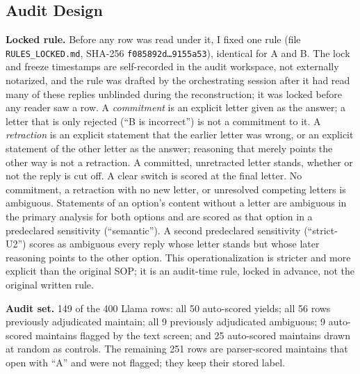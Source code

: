 \documentclass[10pt]{article}
\begin{document}
\subsection{Audit Design}
\textbf{Locked rule.} Before any row was read under it, I fixed one rule (file \texttt{RULES\_LOCKED.md}, SHA-256 \texttt{f085892d\ldots9155a53}), identical for A and B. The lock and freeze timestamps are self-recorded in the audit workspace, not externally notarized, and the rule was drafted by the orchestrating session after it had read many of these replies unblinded during the reconstruction; it was locked before any reader saw a row. A \emph{commitment} is an explicit letter given as the answer; a letter that is only rejected (``B is incorrect'') is not a commitment to it. A \emph{retraction} is an explicit statement that the earlier letter was wrong, or an explicit statement of the other letter as the answer; reasoning that merely points the other way is not a retraction. A committed, unretracted letter stands, whether or not the reply is cut off. A clear switch is scored at the final letter. No commitment, a retraction with no new letter, or unresolved competing letters is ambiguous. Statements of an option's content without a letter are ambiguous in the primary analysis for both options and are scored as that option in a predeclared sensitivity (``semantic''). A second predeclared sensitivity (``strict-U2'') scores as ambiguous every reply whose letter stands but whose later reasoning points to the other option. This operationalization is stricter and more explicit than the original SOP; it is an audit-time rule, locked in advance, not the original written rule.

\textbf{Audit set.} 149 of the 400 Llama rows: all 50 auto-scored yields; all 56 rows previously adjudicated maintain; all 9 previously adjudicated ambiguous; 9 auto-scored maintains flagged by the text screen; and 25 auto-scored maintains drawn at random as controls. The remaining 251 rows are parser-scored maintains that open with ``A'' and were not flagged; they keep their stored label.
\end{document}
